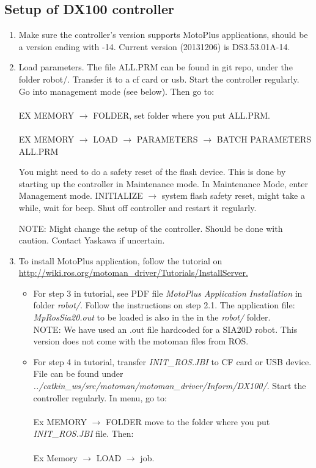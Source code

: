 \documentclass[10pt,a4paper]{article}
\begin{document}
\subsection{Setup of DX100 controller}

\begin{enumerate}

\item Make sure the controller’s version supports MotoPlus applications, should be a version ending with -14.
 Current version (20131206) is DS3.53.01A-14. 

\item Load parameters.
The file ALL.PRM can be found in git repo, under the folder robot/. Transfer it to a cf card or usb.
Start the controller regularly.
Go into management mode (see below).
Then go to:\\\\
 EX MEMORY $\rightarrow$ FOLDER, set folder where you put ALL.PRM.\\\\
EX MEMORY $\rightarrow$ LOAD $\rightarrow$ PARAMETERS $\rightarrow$ BATCH PARAMETERS ALL.PRM

You might need to do a safety reset of the flash device. 
This is done by starting up the controller in Maintenance mode.   
In Maintenance Mode, enter Management mode.
INITIALIZE $\rightarrow$ system flash safety reset, might take a while, wait for beep.
Shut off controller and restart it regularly.


NOTE: Might change the setup of the controller. Should be done with caution. Contact 	
Yaskawa if uncertain.
 

\item To install MotoPlus application, follow the tutorial on \url{http://wiki.ros.org/motoman\_driver/Tutorials/InstallServer.}
\begin{itemize}

\item For step 3 in tutorial, see PDF file \textit{MotoPlus Application Installation} in folder \textit{robot/}. 
Follow the instructions on step 2.1. 
The application file: \textit{MpRosSia20.out} to be loaded is also in the in the \textit{robot/} folder.\\

NOTE: We have used an .out file hardcoded for a SIA20D robot. This version does not come with the motoman files from ROS.\\

\item For step 4 in tutorial, transfer \textit{INIT\_ROS.JBI} to CF card or USB device. 
File can be found under \textit{../catkin\_ws/src/motoman/motoman\_driver/Inform/DX100/}. 
Start the controller regularly. In menu, go to: \\\\
Ex MEMORY $\rightarrow$ FOLDER move to the folder where you put \textit{INIT\_ROS.JBI} file. Then:\\\\
Ex Memory $\rightarrow$ LOAD $\rightarrow$ job.
\end{itemize}


\end{enumerate}
\end{document}
